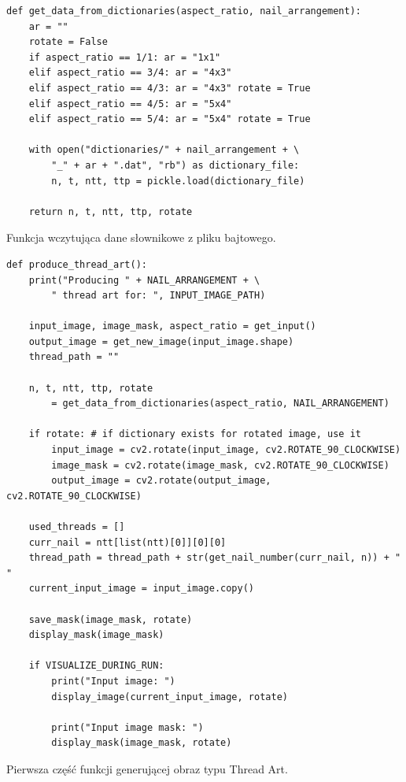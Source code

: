         \begin{code}[H]
        \begin{verbatim}
def get_data_from_dictionaries(aspect_ratio, nail_arrangement):
    ar = ""
    rotate = False
    if aspect_ratio == 1/1: ar = "1x1"
    elif aspect_ratio == 3/4: ar = "4x3"
    elif aspect_ratio == 4/3: ar = "4x3" rotate = True
    elif aspect_ratio == 4/5: ar = "5x4"
    elif aspect_ratio == 5/4: ar = "5x4" rotate = True

    with open("dictionaries/" + nail_arrangement + \
        "_" + ar + ".dat", "rb") as dictionary_file:
        n, t, ntt, ttp = pickle.load(dictionary_file)

    return n, t, ntt, ttp, rotate
        \end{verbatim}
        \caption{Funkcja wczytująca dane słownikowe z pliku bajtowego.}
        \label{imp-art-read-dict-code}
        \end{code}
        
        \begin{code}[H]
        \begin{verbatim}
def produce_thread_art():
    print("Producing " + NAIL_ARRANGEMENT + \
        " thread art for: ", INPUT_IMAGE_PATH)
    
    input_image, image_mask, aspect_ratio = get_input()
    output_image = get_new_image(input_image.shape)
    thread_path = ""

    n, t, ntt, ttp, rotate 
        = get_data_from_dictionaries(aspect_ratio, NAIL_ARRANGEMENT)

    if rotate: # if dictionary exists for rotated image, use it
        input_image = cv2.rotate(input_image, cv2.ROTATE_90_CLOCKWISE)
        image_mask = cv2.rotate(image_mask, cv2.ROTATE_90_CLOCKWISE)
        output_image = cv2.rotate(output_image, cv2.ROTATE_90_CLOCKWISE)

    used_threads = []
    curr_nail = ntt[list(ntt)[0]][0][0]
    thread_path = thread_path + str(get_nail_number(curr_nail, n)) + " "
    current_input_image = input_image.copy()

    save_mask(image_mask, rotate)
    display_mask(image_mask)
    
    if VISUALIZE_DURING_RUN:
        print("Input image: ")
        display_image(current_input_image, rotate)
        
        print("Input image mask: ")
        display_mask(image_mask, rotate)
        \end{verbatim}
        \caption{Pierwsza część funkcji generującej obraz typu Thread Art.}
        \label{imp-art-algorithm-prep-code}
        \end{code}
        

